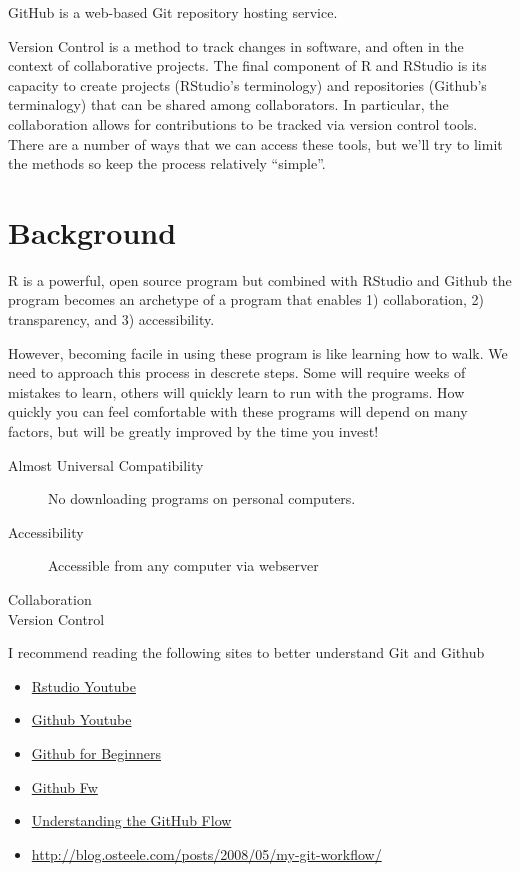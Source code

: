 \documentclass[12pt]{../SOP3_beta}
\begin{document}
\NP GitHub is a web-based Git repository hosting service. 

\NP Version Control is a method to track changes in software, and often in the context of collaborative projects. The final component of R and RStudio is its capacity to create projects (RStudio's terminology) and repositories (Github's terminalogy) that can be shared among collaborators. In particular, the collaboration allows for contributions to be tracked via version control tools. There are a number of ways that we can access these tools, but we'll try to limit the methods so keep the process relatively ``simple''.


\section{Background}

\NP R is a powerful, open source program but combined with RStudio and Github the program becomes an archetype of a program that enables 1) collaboration, 2) transparency, and 3) accessibility.

\NP However, becoming facile in using these program is like learning how to walk. We need to approach this process in descrete steps. Some will require weeks of mistakes to learn, others will quickly learn to run with the programs. How quickly you can feel comfortable with these programs will depend on many factors, but will be greatly improved by the time you invest!

\begin{description}
  \item[Almost Universal Compatibility] No downloading programs on personal computers.
  \item[Accessibility] Accessible from any computer via webserver
  \item[Collaboration]
  \item[Version Control]
\end{description}

\NP I recommend reading the following sites to better understand Git and Github

\begin{itemize}
  \item \href{https://www.youtube.com/watch?v=uHYcDQDbMY8}{Rstudio Youtube}
  \item \href{https://www.youtube.com/watch?v=0fKg7e37bQE}{Github Youtube}
  \item \href{http://product.hubspot.com/blog/git-and-github-tutorial-for-beginners}{Github for Beginners}
  \item \href{http://scottchacon.com/2011/08/31/github-flow.html}{Github Fw}
  \item \href{https://guides.github.com/introduction/flow/}{Understanding the GitHub Flow}
  \item \href{http://blog.osteele.com/posts/2008/05/my-git-workflow/}{http://blog.osteele.com/posts/2008/05/my-git-workflow/}
  
\end{itemize}
\end{document}

